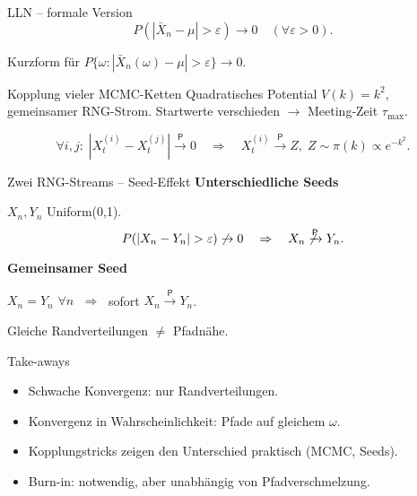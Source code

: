 \documentclass[aspectratio=169]{beamer}
\begin{document}
\begin{frame}{LLN – formale Version}
\small
\[
P(|\bar X_n-\mu|>\varepsilon)\to0
\quad(\forall\varepsilon>0).
\]

Kurzform für  
$P\bigl\{\omega:|\bar X_n(\omega)-\mu|>\varepsilon\bigr\}\to0$.
\end{frame}

\begin{frame}{Kopplung vieler MCMC-Ketten}
\small
Quadratisches Potential $V(k)=k^2$, gemeinsamer RNG-Strom.  
Startwerte verschieden $\to$ Meeting‐Zeit $\tau_{\max}$.

\[
\forall i,j:\;
|X_t^{(i)}-X_t^{(j)}|\xrightarrow{\mathsf P}0
\quad\Longrightarrow\quad
X_t^{(i)}\xrightarrow{\mathsf P}Z,\;Z\sim\pi(k)\propto e^{-k^{2}}.
\]
\end{frame}

\begin{frame}{Zwei RNG-Streams – Seed-Effekt}
\small
\textbf{Unterschiedliche Seeds}

$X_n,Y_n$ Uniform(0,1).  
\[
P(|X_n-Y_n|>\varepsilon)\not\to0
\quad\Rightarrow\quad
X_n\not\xrightarrow{\mathsf P}Y_n.
\]

\textbf{Gemeinsamer Seed}

$X_n=Y_n$ $\forall n$
$\;\Rightarrow\;$ sofort $X_n\xrightarrow{\mathsf P}Y_n$.

Gleiche Randverteilungen $\neq$ Pfadnähe.
\end{frame}

\begin{frame}{Take-aways}
\begin{itemize}
  \item Schwache Konvergenz: nur Randverteilungen.  
  \item Konvergenz in Wahrscheinlichkeit: Pfade auf gleichem $\omega$.  
  \item Kopplungstricks zeigen den Unterschied praktisch (MCMC, Seeds).  
  \item Burn-in: notwendig, aber unabhängig von Pfadverschmelzung.
\end{itemize}
\end{frame}

\end{document}
